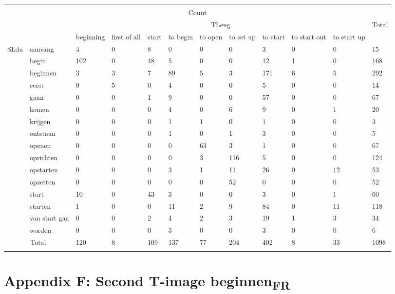 \begin{tabularx}{\textwidth}{XXXXXXXXXXXX}
\lsptoprule
\multicolumn{12}{c}{ \textbf{SLdu} \textbf{*} \textbf{TLeng} \textbf{Crosstabulation}}\\
\multicolumn{12}{c}{Count} \\
\multicolumn{2}{c}{} & \multicolumn{9}{c}{ TLeng} & Total\\
\hhline{~~----------} &  & beginning & first of all & start & to begin & to open & to set up & to start & to start out & to start up & \\
\multicolumn{1}{c}{SLdu} & aanvang &  4 &  0 &  8 &  0 &  0 &  0 &  3 &  0 &  0 &  15\\
& begin &  102 &  0 &  48 &  5 &  0 &  0 &  12 &  1 &  0 &  168\\
& beginnen &  3 &  3 &  7 &  89 &  5 &  3 &  171 &  6 &  5 &  292\\
& eerst &  0 &  5 &  0 &  4 &  0 &  0 &  5 &  0 &  0 &  14\\
& gaan &  0 &  0 &  1 &  9 &  0 &  0 &  57 &  0 &  0 &  67\\
& komen &  0 &  0 &  0 &  4 &  0 &  6 &  9 &  0 &  1 &  20\\
& krijgen &  0 &  0 &  0 &  1 &  1 &  0 &  1 &  0 &  0 &  3\\
& ontstaan &  0 &  0 &  0 &  1 &  0 &  1 &  3 &  0 &  0 &  5\\
& openen &  0 &  0 &  0 &  0 &  63 &  3 &  1 &  0 &  0 &  67\\
& oprichten &  0 &  0 &  0 &  0 &  3 &  116 &  5 &  0 &  0 &  124\\
& opstarten &  0 &  0 &  0 &  3 &  1 &  11 &  26 &  0 &  12 &  53\\
& opzetten &  0 &  0 &  0 &  0 &  0 &  52 &  0 &  0 &  0 &  52\\
& start &  10 &  0 &  43 &  3 &  0 &  0 &  3 &  0 &  1 &  60\\
& starten &  1 &  0 &  0 &  11 &  2 &  9 &  84 &  0 &  11 &  118\\
& van start gaa &  0 &  0 &  2 &  4 &  2 &  3 &  19 &  1 &  3 &  34\\
& worden &  0 &  0 &  0 &  3 &  0 &  0 &  3 &  0 &  0 &  6\\
\multicolumn{2}{c}{Total} &  120 &  8 &  109 &  137 &  77 &  204 &  402 &  8 &  33 &  1098\\
\lspbottomrule
\end{tabularx}
\section{Appendix F: Second T-image beginnen\textsubscript{FR}}


